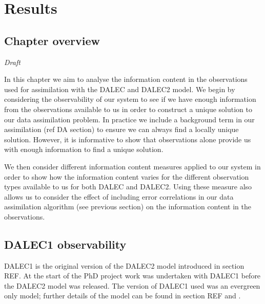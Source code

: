 \documentclass[11pt]{article}
\begin{document}
\section{Results}

\subsection{Chapter overview}
\textit{Draft}

In this chapter we aim to analyse the information content in the observations used for assimilation with the DALEC and DALEC2 model. We begin by considering the observability of our system to see if we have enough information from the observations available to us in order to construct a unique solution to our data assimilation problem. In practice we include a background term in our assimilation (ref DA section) to ensure we can always find a locally unique solution. However, it is informative to show that observations alone provide us with enough information to find a unique solution.

We then consider different information content measures applied to our system in order to show how the information content varies for the different observation types available to us for both DALEC and DALEC2. Using these measure also allows us to consider the effect of including error correlations in our data assimilation algorithm (see previous section) on the information content in the observations.

\subsection{DALEC1 observability} \label{sec:D1observability}

DALEC1 is the original version of the DALEC2 model introduced in section {\color{red} REF}. At the start of the PhD project work was undertaken with DALEC1 before the DALEC2 model was released. The version of DALEC1 used was an evergreen only model; further details of the model can be found in section {\color{red} REF} and \citet{williams2005improved}. 
\end{document}
